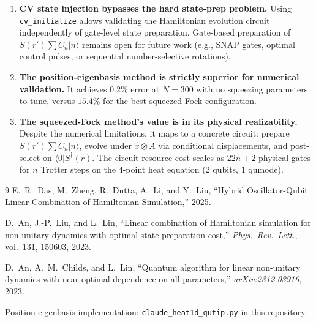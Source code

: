 \documentclass[11pt]{article}
\begin{document}
\begin{enumerate}[itemsep=3pt]
  \item \textbf{CV state injection bypasses the hard state-prep problem.}
        Using \texttt{cv\_initialize} allows validating the Hamiltonian evolution
        circuit independently of gate-level state preparation.
        Gate-based preparation of $S(r')\sum C_n|n\rangle$ remains open for
        future work (e.g., SNAP gates, optimal control pulses, or sequential
        number-selective rotations).

  \item \textbf{The position-eigenbasis method is strictly superior for numerical
        validation.}
        It achieves $0.2\%$ error at $N = 300$ with no squeezing parameters to tune,
        versus $15.4\%$ for the best squeezed-Fock configuration.

  \item \textbf{The squeezed-Fock method's value is in its physical realizability.}
        Despite the numerical limitations, it maps to a concrete circuit:
        prepare $S(r')\sum C_n|n\rangle$, evolve under $\hat{x}\otimes A$
        via conditional displacements, and post-select on $\langle 0|S^\dagger(r)$.
        The circuit resource cost scales as $22n + 2$ physical gates for
        $n$ Trotter steps on the 4-point heat equation (2 qubits, 1 qumode).
\end{enumerate}

\begin{thebibliography}{9}
E.~R.~Das, M.~Zheng, R.~Dutta, A.~Li, and Y.~Liu,
``Hybrid Oscillator-Qubit Linear Combination of Hamiltonian Simulation,''
2025.

D.~An, J.-P.~Liu, and L.~Lin,
``Linear combination of Hamiltonian simulation for non-unitary dynamics
with optimal state preparation cost,''
\textit{Phys.\ Rev.\ Lett.}, vol.~131, 150603, 2023.

D.~An, A.~M.~Childs, and L.~Lin,
``Quantum algorithm for linear non-unitary dynamics with near-optimal
dependence on all parameters,''
\textit{arXiv:2312.03916}, 2023.

Position-eigenbasis implementation:
\texttt{claude\_heat1d\_qutip.py} in this repository.
\end{thebibliography}
\end{document}
